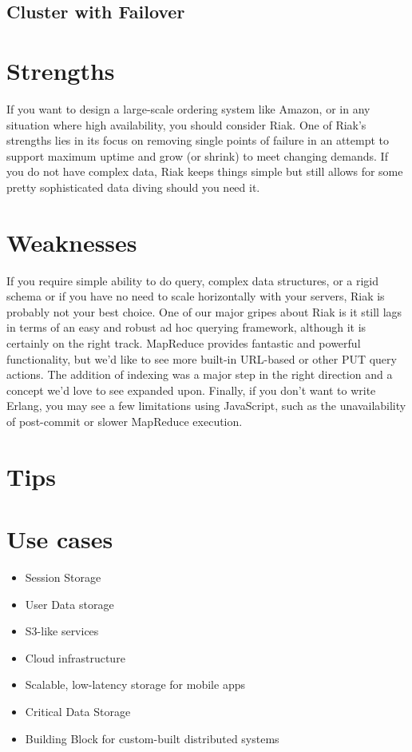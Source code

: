 \subsection{Cluster with Failover}



\section{Strengths}

If you want to design a large-scale ordering system like Amazon, or in any situation where high availability, you should consider Riak. One of Riak's strengths lies in its focus on removing single points of failure in an attempt to support maximum uptime and grow (or shrink) to meet changing demands. If you do not have complex data, Riak keeps things simple but still allows for some pretty sophisticated data diving should you need it.\cite{seven_databases}

\section{Weaknesses}

If you require simple ability to do query, complex data structures, or a rigid schema or if you have no need to scale horizontally with your servers, Riak is probably not your best choice. One of our major gripes about Riak is it still lags in terms of an easy and robust ad hoc querying framework, although it is certainly on the right track. MapReduce provides fantastic and powerful functionality, but we’d like to see more built-in URL-based or other PUT query actions. The addition of indexing was a major step in the right direction and a concept we’d love to see expanded upon. Finally, if you don’t want to write Erlang, you may see a few limitations using JavaScript, such as the unavailability of post-commit or slower MapReduce execution.\cite{seven_databases}

\section{Tips}

\section{Use cases}

\begin{itemize}
  \item Session Storage
  \item User Data storage
  \item S3-like services
  \item Cloud infrastructure
  \item Scalable, low-latency storage for mobile apps
  \item Critical Data Storage
  \item Building Block for custom-built distributed systems
\end{itemize}